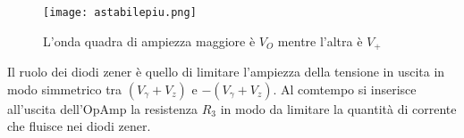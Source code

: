 \begin{figure}[h]
	\centering
	\texttt{[image: astabilepiu.png]}
	\caption{L'onda quadra di ampiezza maggiore è $V_O$ mentre l'altra è $V_+$}
	\label{f:astabile+}
\end{figure}

Il ruolo dei diodi zener è quello di limitare l'ampiezza della tensione in uscita in modo simmetrico tra $(V_\gamma + V_z)$ e $-(V_\gamma + V_z)$. Al comtempo si inserisce all'uscita dell'OpAmp la resistenza $R_3$ in modo da limitare la quantità di corrente che fluisce nei diodi zener.
